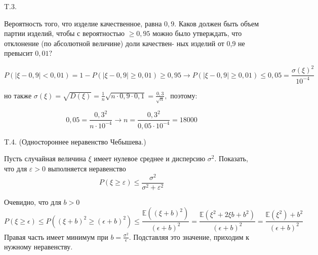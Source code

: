 \documentclass[a4paper,12pt]{article} %
\begin{document}
\begin{example} T.3. 


Вероятность того, что изделие качественное, равна $0,9 .$ 
Каков должен быть объем партии изделий, чтобы с вероятностью $\geq 0,95$ можно было утверждать, что отклонение (по абсолютной величине) доли качествен-
ных изделий от 0,9 не превысит $0,01 ?$




\[ P(|\xi-0,9|<0,01)=1-P(|\xi-0,9| \geq 0,01) \geq 0,95 \rightarrow P(|\xi-0,9| \geq 0,01) \leq 0,05=\frac{\sigma(\xi)^{2}}{10^{-4}}  \]


но также 
$  \sigma(\xi)=\sqrt{D(\xi)}=\frac{1}{n} \sqrt{n \cdot 0,9 \cdot 0,1}=\frac{0,3}{\sqrt{n}},$
поэтому:

\[ 
0,05=\frac{0,3^{2}}{n \cdot 10^{-4}} \rightarrow n=\frac{0,3^{2}}{0,05 \cdot 10^{-4}}=18000
\]








\end{example}





\begin{example} T.4. (Одностороннее неравенство Чебышева.) 


Пусть случайная величина $\xi$ имеет нулевое среднее и дисперсию $\sigma^{2}$. 
Показать, что для $\varepsilon>0$ выполняется неравенство
$$
P(\xi \geq \varepsilon) \leq \frac{\sigma^{2}}{\sigma^{2}+\varepsilon^{2}}
$$



Очевидно, что для $b>0$
$$
P(\xi \geq \epsilon) \leq P\left((\xi+b)^{2} \geq(\epsilon+b)^{2}\right) \leq \frac{\mathbb{E}\left((\xi+b)^{2}\right)}{(\epsilon+b)^{2}}=\frac{\mathbb{E}\left(\xi^{2}+2 \xi b+b^{2}\right)}{(\epsilon+b)^{2}}=\frac{\mathbb{E}\left(\xi^{2}\right)+b^{2}}{(\epsilon+b)^{2}}
$$
Правая часть имеет минимум при $b=\frac{\sigma^{2}}{\epsilon} .$ Подставляя это значение, приходим к нужному неравенству.







\end{example}
\end{document}
